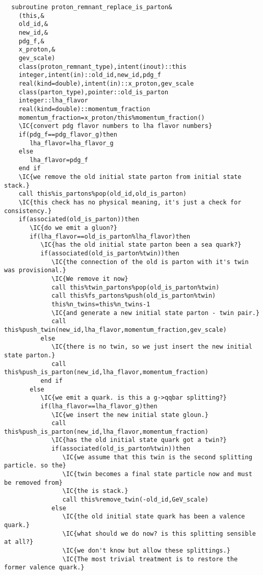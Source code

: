 \begin{Verbatim}
  subroutine proton_remnant_replace_is_parton&
    (this,&
    old_id,&
    new_id,&
    pdg_f,&
    x_proton,&
    gev_scale)
    class(proton_remnant_type),intent(inout)::this
    integer,intent(in)::old_id,new_id,pdg_f
    real(kind=double),intent(in)::x_proton,gev_scale
    class(parton_type),pointer::old_is_parton
    integer::lha_flavor
    real(kind=double)::momentum_fraction
    momentum_fraction=x_proton/this%momentum_fraction()
    \IC{convert pdg flavor numbers to lha flavor numbers}
    if(pdg_f==pdg_flavor_g)then
       lha_flavor=lha_flavor_g
    else
       lha_flavor=pdg_f
    end if
    \IC{we remove the old initial state parton from initial state stack.}
    call this%is_partons%pop(old_id,old_is_parton)
    \IC{this check has no physical meaning, it's just a check for consistency.}
    if(associated(old_is_parton))then
       \IC{do we emit a gluon?}
       if(lha_flavor==old_is_parton%lha_flavor)then
          \IC{has the old initial state parton been a sea quark?}
          if(associated(old_is_parton%twin))then
             \IC{the connection of the old is parton with it's twin was provisional.}
             \IC{We remove it now}
             call this%twin_partons%pop(old_is_parton%twin)
             call this%fs_partons%push(old_is_parton%twin)
             this%n_twins=this%n_twins-1
             \IC{and generate a new initial state parton - twin pair.}
             call this%push_twin(new_id,lha_flavor,momentum_fraction,gev_scale)
          else
             \IC{there is no twin, so we just insert the new initial state parton.}
             call this%push_is_parton(new_id,lha_flavor,momentum_fraction)
          end if
       else
          \IC{we emit a quark. is this a g->qqbar splitting?}
          if(lha_flavor==lha_flavor_g)then
             \IC{we insert the new initial state gloun.}
             call this%push_is_parton(new_id,lha_flavor,momentum_fraction)
             \IC{has the old initial state quark got a twin?}
             if(associated(old_is_parton%twin))then
                \IC{we assume that this twin is the second splitting particle. so the}
                \IC{twin becomes a final state particle now and must be removed from}
                \IC{the is stack.}
                call this%remove_twin(-old_id,GeV_scale)
             else
                \IC{the old initial state quark has been a valence quark.}
                \IC{what should we do now? is this splitting sensible at all?}
                \IC{we don't know but allow these splittings.}
                \IC{The most trivial treatment is to restore the former valence quark.}

\end{Verbatim}
